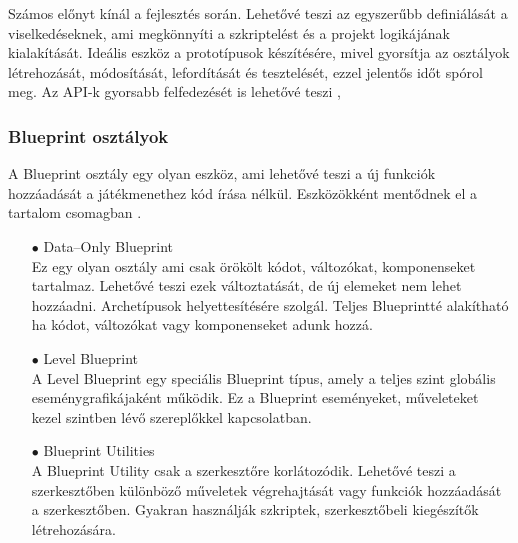 \documentclass[
]{thesis-ekf}
\theoremstyle{definition}
\theoremstyle{remark}
\begin{document}
Számos előnyt kínál a fejlesztés során. Lehetővé teszi az egyszerűbb definiálását a viselkedéseknek, ami megkönnyíti a szkriptelést és a projekt logikájának kialakítását. Ideális eszköz a prototípusok készítésére, mivel gyorsítja az osztályok létrehozását, módosítását, lefordítását és tesztelését, ezzel jelentős időt spórol meg. Az API-k gyorsabb felfedezését is lehetővé teszi \cite{UnrealBlueprint},
\subsubsection{Blueprint osztályok}
A Blueprint osztály egy olyan eszköz, ami lehetővé teszi a új funkciók hozzáadását a játékmenethez kód írása nélkül. Eszközökként mentődnek el a tartalom csomagban \cite{UnrealBlueprintClasses}.
\begin{itemize}
	\item[$\bullet$] Data--Only Blueprint \\ Ez egy olyan osztály ami csak örökölt kódot, változókat, komponenseket tartalmaz. Lehetővé teszi ezek változtatását, de új elemeket nem lehet hozzáadni. Archetípusok helyettesítésére szolgál. Teljes Blueprintté alakítható ha kódot, változókat vagy komponenseket adunk hozzá.
	\item[$\bullet$] Level Blueprint \\ A Level Blueprint egy speciális Blueprint típus, amely a teljes szint globális eseménygrafikájaként működik. Ez a Blueprint eseményeket, műveleteket kezel szintben lévő szereplőkkel kapcsolatban.
	\item[$\bullet$] Blueprint Utilities \\ A Blueprint Utility csak a szerkesztőre korlátozódik. Lehetővé teszi a szerkesztőben különböző  műveletek végrehajtását vagy funkciók hozzáadását a szerkesztőben. Gyakran használják szkriptek, szerkesztőbeli kiegészítők létrehozására. 
\end{itemize}
\end{document}
